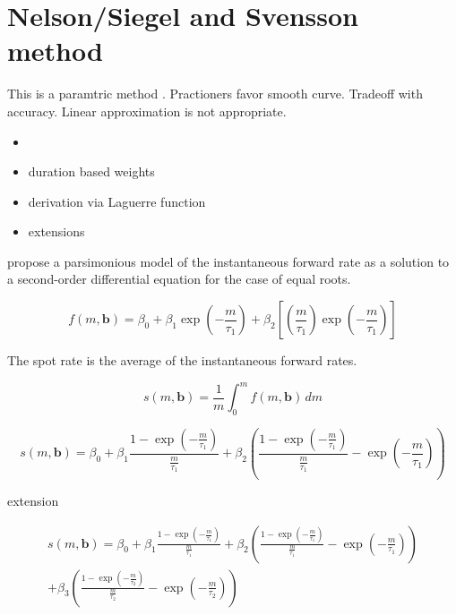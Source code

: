 \section{Nelson/Siegel and Svensson method}
\label{sec:nels-svenss-meth}

This is a paramtric method \citep[see][chapter 15]{James2000}. Practioners favor smooth curve. Tradeoff with accuracy. Linear approximation is not appropriate.

\begin{itemize}
\item \cite{Geyer1999}
\item duration based weights \cite{Bliss1997}
\item derivation via Laguerre function
\item extensions \cite{Bjoerk 1999, Filipovic1999, Filipovic2000, Bjoerk2001, Bjoerk2002, Soederlind1997, Bliss1997}
\end{itemize}


\cite{Nelson1987} propose a parsimonious  model of  the instantaneous forward rate as a solution to a second-order differential equation for the case of equal roots.

\begin{equation}
  \label{eq:laguerre}
  f(m,\bm{b}) = \beta_0+\beta_1\exp\left(-\frac{m}{\tau_1}\right)+\beta_2\left[\left(\frac{m}{\tau_1}\right)\exp\left(-\frac{m}{\tau_1}\right)\right]
\end{equation}


The spot rate is the average of the instantaneous forward rates. 

\begin{equation}
  \label{eq:intspotrate}
  s(m,\bm{b})=\frac{1}{m}\int_0^mf(m,\bm{b})\,dm
\end{equation}


\begin{equation}
  \label{eq:nelson-spot}
   s(m,\bm{b}) = \beta_0 + \beta_1\frac{1-\exp(-\frac{m}{\tau_1})}{\frac{m}{\tau_1}} + \beta_2\left(\frac{1-\exp(-\frac{m}{\tau_1})}{\frac{m}{\tau_1}} - \exp(-\frac{m}{\tau_1})\right)
\end{equation}



%
 
\cite{Svensson1994} extension


\begin{multline}\label{eq:svensson-spot}
    s(m,\bm{b}) = \beta_0 + \beta_1\frac{1-\exp(-\frac{m}{\tau_1})}{\frac{m}{\tau_1}} + \beta_2\left(\frac{1-\exp(-\frac{m}{\tau_1})}{\frac{m}{\tau_1}} - \exp(-\frac{m}{\tau_1})\right) \\+ \beta_3\left(\frac{1-\exp(-\frac{m}{\tau_2})}{\frac{m}{\tau_2}} - \exp(-\frac{m}{\tau_2})\right)
\end{multline}



